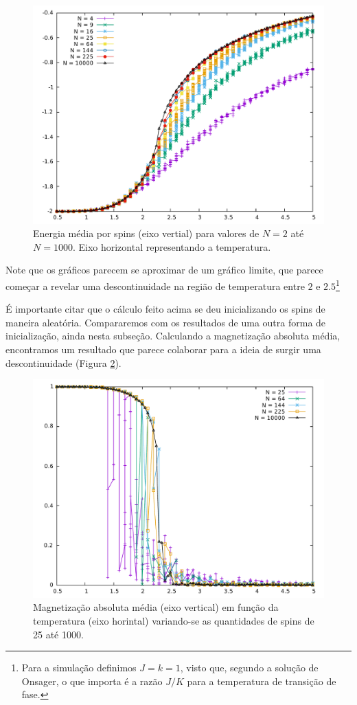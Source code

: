 \begin{figure}[h]
	\center
	\includegraphics[scale=.35]{Energy.pdf}
	\caption{Energia média por spins (eixo vertial) para valores de $N=2$ até $N = 1000$. Eixo horizontal representando a temperatura.}
	\label{fig:II.2}
\end{figure}

Note que os gráficos parecem se aproximar de um gráfico limite, que parece começar a revelar uma descontinuidade na região de temperatura entre $2$ e $2.5$\footnote{Para a simulação definimos $J = k = 1$, visto que, segundo a solução de Onsager, o que importa é a razão $J/K$ para a temperatura de transição de fase.}

É importante citar que o cálculo feito acima se deu inicializando os spins de maneira aleatória. Compararemos com os resultados de uma outra forma de inicialização, ainda nesta subseção. Calculando a magnetização absoluta média, encontramos um resultado que parece colaborar para a ideia de surgir uma descontinuidade (Figura \ref{fig:II.3}).

\begin{figure}[h]
	\center
	\includegraphics[scale=.35]{Magnetization.pdf}
	\caption{Magnetização absoluta média (eixo vertical) em função da temperatura (eixo horintal) variando-se as quantidades de spins de 25 até 1000.}
	\label{fig:II.3}
\end{figure}

